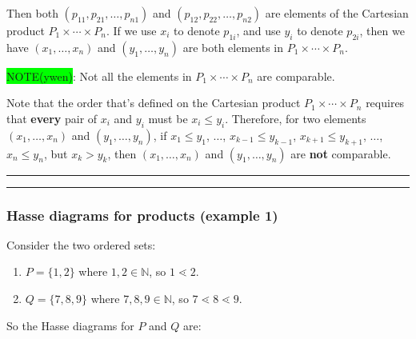 \documentclass[12pt, letterpaper, oneside]{book}
\begin{document}
Then both $(p_{11}, p_{21}, \ldots, p_{n1})$ and $(p_{12}, p_{22}, \ldots, p_{n2})$ are elements of the Cartesian
product $P_1 \times \cdots \times P_n$. If we use $x_i$ to denote $p_{1i}$, and use $y_i$ to denote $p_{2i}$, then we
have $(x_1, \ldots, x_n)$ and $(y_1, \ldots, y_n)$ are both elements in $P_1 \times \cdots \times P_n$.

\colorbox{lime}{NOTE(ywen)}: Not all the elements in $P_1 \times \cdots \times P_n$ are comparable.

Note that the order that's defined on the Cartesian product $P_1 \times \cdots \times P_n$ requires that \textbf{every}
pair of $x_i$ and $y_i$ must be $x_i \leqslant y_i$. Therefore, for two elements $(x_1, \ldots, x_n)$ and $(y_1, \ldots, y_n)$,
if $x_1 \leqslant y_1$, $\ldots$, $x_{k-1} \leqslant y_{k-1}$, $x_{k+1} \leqslant y_{k+1}$, $\ldots$, $x_n \leqslant y_n$,
but $x_k > y_k$, then $(x_1, \ldots, x_n)$ and $(y_1, \ldots, y_n)$ are \textbf{not} comparable.

\noindent\rule{10cm}{0.4pt}\rule{1cm}{10pt}

\subsubsection{Hasse diagrams for products (example 1)}

Consider the two ordered sets:
\begin{enumerate}
  \item $P = \{1, 2\}$ where $1, 2 \in \mathbb{N}$, so $1 \lessdot 2$.
  \item $Q = \{7, 8, 9\}$ where $7, 8, 9 \in \mathbb{N}$, so $7 \lessdot 8 \lessdot 9$.
\end{enumerate}

So the Hasse diagrams for $P$ and $Q$ are:

\end{document}
